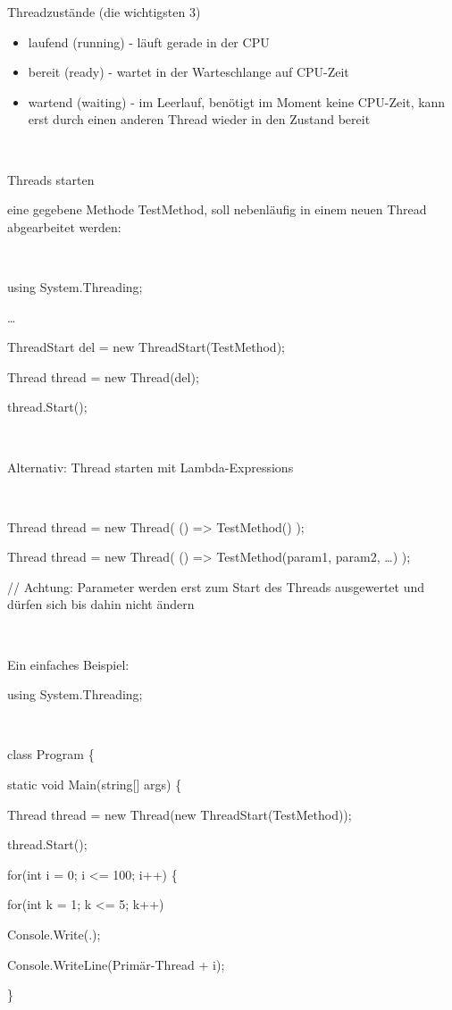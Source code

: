 Threadzustände (die wichtigsten 3)

\begin{itemize}
\item laufend (running) - läuft gerade in der CPU
\item bereit (ready) - wartet in der Warteschlange auf CPU-Zeit
\item wartend (waiting) - im Leerlauf, benötigt im Moment keine CPU-Zeit, kann erst durch einen anderen Thread wieder in den Zustand bereit 
\end{itemize}
~

Threads starten

eine gegebene Methode TestMethod, soll nebenläufig in einem neuen Thread abgearbeitet werden:

~

using System.Threading;

…

ThreadStart del = new ThreadStart(TestMethod);

Thread thread = new Thread(del);

thread.Start();

~

Alternativ: Thread starten mit Lambda-Expressions

~

Thread thread = new Thread( () ={\textgreater} TestMethod() );

Thread thread = new Thread( () ={\textgreater} TestMethod(param1, param2, …) );

// Achtung: Parameter werden erst zum Start des Threads ausgewertet und dürfen sich bis dahin nicht ändern 

~

Ein einfaches Beispiel:

using System.Threading;

~

class Program \{

 static void Main(string[] args) \{

 Thread thread = new Thread(new ThreadStart(TestMethod));

 thread.Start();

 for(int i = 0; i {\textless}= 100; i++) \{

 for(int k = 1; k {\textless}= 5; k++)

 Console.Write({\textquotedbl}.{\textquotedbl});

 Console.WriteLine({\textquotedbl}Primär-Thread {\textquotedbl} + i);

 \}

